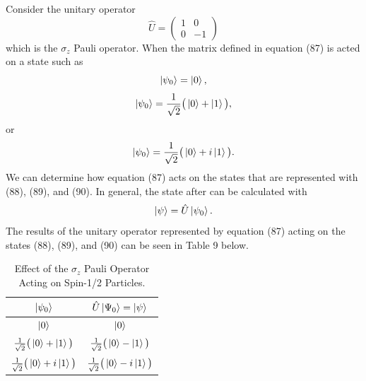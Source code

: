 \documentclass[twocolumn]{article}
\begin{document}
Consider the unitary operator
\begin{equation}
\hat{U}=
\begin{pmatrix}
1 & 0 \\
0 & -1
\end{pmatrix}
\end{equation}
which is the $\sigma_z$ Pauli operator. When the matrix defined in equation (87) is acted on a state such as
\begin{equation}
\ket{\psi_0}=\ket{0},
\end{equation}
\begin{equation}
\ket{\psi_0}=\frac{1}{\sqrt{2}}\big(\ket{0}+\ket{1}\big),
\end{equation}
or
\begin{equation}
\ket{\psi_0}=\frac{1}{\sqrt{2}}\big(\ket{0}+i\ket{1}\big).
\end{equation}
We can determine how equation (87) acts on the states that are represented with (88), (89), and (90). In general, the state after can be calculated with
\begin{equation}
\ket{\psi}=\hat{U}\ket{\psi_0}.
\end{equation}
The results of the unitary operator represented by equation (87) acting on the states (88), (89), and (90) can be seen in Table 9 below.
\begin{table}[h!]
\begin{center}
\begin{tabular}{ |c|c| }
\hline $\ket{\psi_0}$& $\hat{U}\ket{\Psi_0}=\ket{\psi}$ \\
\hline $\ket{0}$& $\ket{0}$\\
\hline $\frac{1}{\sqrt{2}}\big(\ket{0}+\ket{1}\big)$& $\frac{1}{\sqrt{2}}\big(\ket{0}-\ket{1}\big)$\\
\hline $\frac{1}{\sqrt{2}}\big(\ket{0}+i\ket{1}\big)$& $\frac{1}{\sqrt{2}}\big(\ket{0}-i\ket{1}\big)$\\
\hline
\end{tabular}
\caption{Effect of the $\sigma_z$ Pauli Operator Acting on Spin-1/2 Particles.}
\end{center}
\end{table} \\
\end{document}
